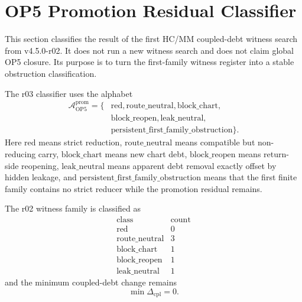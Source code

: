
\section{OP5 Promotion Residual Classifier}
\label{sec:v450-r03-op5-promotion-residual-classifier}

This section classifies the result of the first HC/MM coupled-debt witness
search from v4.5.0-r02.  It does not run a new witness search and does not
claim global OP5 closure.  Its purpose is to turn the first-family witness
register into a stable obstruction classification.

\begin{definition}
The r03 classifier uses the alphabet
\[
\begin{aligned}
    \mathcal A_{\mathrm{OP5}}^{\mathrm{prom}}
    =\{&\mathrm{red},\mathrm{route\_neutral},\mathrm{block\_chart},\\
       &\mathrm{block\_reopen},\mathrm{leak\_neutral},\\
       &\mathrm{persistent\_first\_family\_obstruction}\}.
\end{aligned}
\]
Here \(\mathrm{red}\) means strict reduction, \(\mathrm{route\_neutral}\) means
compatible but non-reducing carry, \(\mathrm{block\_chart}\) means new chart
debt, \(\mathrm{block\_reopen}\) means return-side reopening,
\(\mathrm{leak\_neutral}\) means apparent debt removal exactly offset by
hidden leakage, and \(\mathrm{persistent\_first\_family\_obstruction}\) means
that the first finite family contains no strict reducer while the promotion
residual remains.
\end{definition}

\begin{proposition}
The r02 witness family is classified as
\[
\begin{array}{c|r}
\text{class} & \text{count}\\
\hline
\mathrm{red} & 0\\
\mathrm{route\_neutral} & 3\\
\mathrm{block\_chart} & 1\\
\mathrm{block\_reopen} & 1\\
\mathrm{leak\_neutral} & 1
\end{array}
\]
and the minimum coupled-debt change remains
\[
    \min \Delta_{\mathrm{cpl}} = 0.
\]
\end{proposition}

